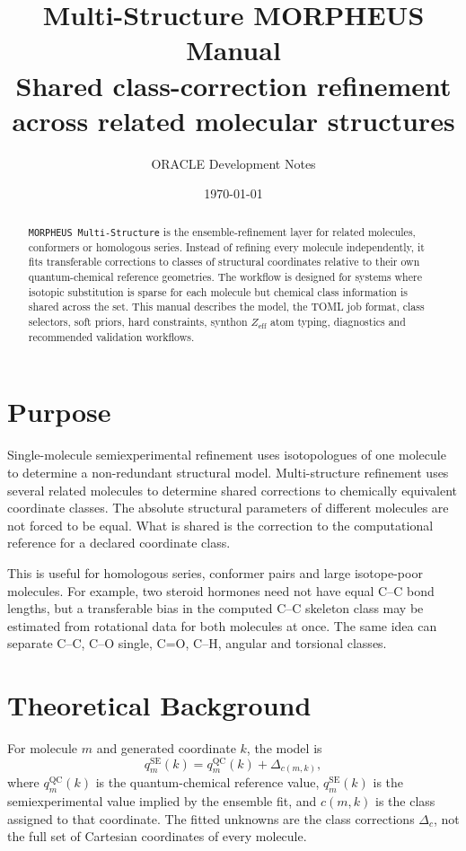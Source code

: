 \documentclass[11pt]{article}
\title{\textbf{Multi-Structure MORPHEUS Manual}\\
\large Shared class-correction refinement across related molecular structures}
\author{ORACLE Development Notes}
\date{\today}
\newcommand{\program}{\texttt{MORPHEUS Multi-Structure}}
\newcommand{\zeff}{Z_\mathrm{eff}}
\begin{document}
\maketitle

\begin{abstract}
\program{} is the ensemble-refinement layer for related molecules, conformers
or homologous series.  Instead of refining every molecule independently, it
fits transferable corrections to classes of structural coordinates relative to
their own quantum-chemical reference geometries.  The workflow is designed for
systems where isotopic substitution is sparse for each molecule but chemical
class information is shared across the set.  This manual describes the model,
the TOML job format, class selectors, soft priors, hard constraints, synthon
\(\zeff\) atom typing, diagnostics and recommended validation workflows.
\end{abstract}

\tableofcontents
\newpage

\section{Purpose}

Single-molecule semiexperimental refinement uses isotopologues of one molecule
to determine a non-redundant structural model.  Multi-structure refinement uses
several related molecules to determine shared corrections to chemically
equivalent coordinate classes.  The absolute structural parameters of different
molecules are not forced to be equal.  What is shared is the correction to the
computational reference for a declared coordinate class.

This is useful for homologous series, conformer pairs and large isotope-poor
molecules.  For example, two steroid hormones need not have equal C--C bond
lengths, but a transferable bias in the computed C--C skeleton class may be
estimated from rotational data for both molecules at once.  The same idea can
separate C--C, C--O single, C=O, C--H, angular and torsional classes.

\section{Theoretical Background}

For molecule \(m\) and generated coordinate \(k\), the model is
\[
  q_m^\mathrm{SE}(k)
  =
  q_m^\mathrm{QC}(k)
  +
  \Delta_{c(m,k)} ,
\]
where \(q_m^\mathrm{QC}(k)\) is the quantum-chemical reference value,
\(q_m^\mathrm{SE}(k)\) is the semiexperimental value implied by the ensemble
fit, and \(c(m,k)\) is the class assigned to that coordinate.  The fitted
unknowns are the class corrections \(\Delta_c\), not the full set of Cartesian
coordinates of every molecule.
\end{document}
